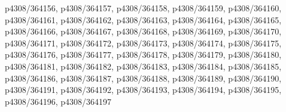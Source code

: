 p4308/364156, p4308/364157, p4308/364158, p4308/364159, p4308/364160, p4308/364161, p4308/364162,
p4308/364163, p4308/364164, p4308/364165, p4308/364166, p4308/364167, p4308/364168, p4308/364169,
p4308/364170, p4308/364171, p4308/364172, p4308/364173, p4308/364174, p4308/364175, p4308/364176,
p4308/364177, p4308/364178, p4308/364179, p4308/364180, p4308/364181, p4308/364182, p4308/364183,
p4308/364184, p4308/364185, p4308/364186, p4308/364187, p4308/364188, p4308/364189, p4308/364190,
p4308/364191, p4308/364192, p4308/364193, p4308/364194, p4308/364195, p4308/364196, p4308/364197